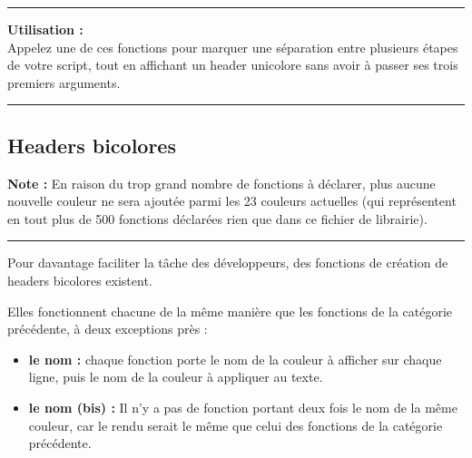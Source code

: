 \documentclass[a4paper,10pt]{article}
\begin{document}
\par\noindent\rule{\textwidth}{0.4pt}

\begin{justify}
    \textbf{Utilisation :}\\
    Appelez une de ces fonctions pour marquer une séparation entre plusieurs étapes de votre script, tout en affichant un header unicolore sans avoir à passer ses trois premiers arguments.
\end{justify}




\color{green}\par\noindent\rule{\textwidth}{0.4pt}\color{white}

\color{green}
\subsection{Headers bicolores}\color{white}

\begin{justify}
    \textbf{Note :} En raison du trop grand nombre de fonctions à déclarer, plus aucune nouvelle couleur ne sera ajoutée parmi les 23 couleurs actuelles (qui représentent en tout plus de 500 fonctions déclarées rien que dans ce fichier de librairie).
\end{justify}

\par\noindent\rule{\textwidth}{0.4pt}

\begin{justify}
    Pour davantage faciliter la tâche des développeurs, des fonctions de création de headers bicolores existent.
\end{justify}

\begin{justify}
    Elles fonctionnent chacune de la même manière que les fonctions de la catégorie précédente, à deux exceptions près :

    \begin{itemize}
        \item \textbf{le nom :} chaque fonction porte le nom de la couleur à afficher sur chaque ligne, puis le nom de la couleur à appliquer au texte.\setlength{\parskip}{1em}

        \item \textbf{le nom (bis) :} Il n'y a pas de fonction portant deux fois le nom de la même couleur, car le rendu serait le même que celui des fonctions de la catégorie précédente.
    \end{itemize}
\end{justify}
\end{document}
